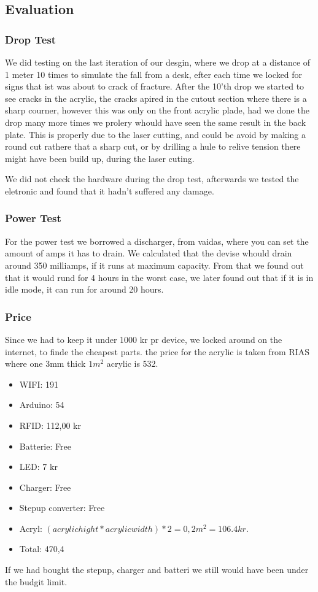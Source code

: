 \subsection{Evaluation}
\subsubsection{Drop Test}
We did testing on the last iteration of our desgin, where we drop at a distance of 1 meter 10 times to simulate the fall from a desk, efter each time we locked for signs that ist was about to crack of fracture.
After the 10'th drop we started to see cracks in the acrylic, the cracks apired in the cutout section where there is a sharp courner, however this was only on the front acrylic plade, had we done the drop many more times we prolery whould have seen the same result in the back plate. 
This is properly due to the laser cutting, and could be avoid by making a round cut rathere that a sharp cut, or by drilling a hule to relive tension there might have been build up, during the laser cuting.

We did not check the hardware during the drop test, afterwards we tested the eletronic and found that it hadn't suffered any damage.

\subsubsection{Power Test}
For the power test we borrowed a discharger, from vaidas, where you can set the amount of amps it has to drain.
We calculated that the devise whould drain around 350 milliamps, if it runs at maximum capacity.
From that we found out that it would rund for 4 hours in the worst case, we later found out that if it is in idle mode, it can run for around 20 hours.

\subsubsection{Price}
Since we had to keep it under 1000 kr pr device, we locked around on the internet, to finde the cheapest parts.
the price for the acrylic is taken from RIAS where one 3mm thick $1 m^2$ acrylic is 532.
\begin{itemize} \itemsep0em
	 \item WIFI: 191 
	 \item Arduino: 54
	 \item RFID: 112,00 kr
	 \item Batterie: Free
	 \item LED: 7 kr
	 \item Charger: Free
	 \item Stepup converter: Free
	  \item Acryl: $(acrylic hight * acrylic width)*2 = 0,2 m^2 = 106.4 kr.$
	 \item Total: 470,4
\end{itemize}
If we had bought the stepup, charger and batteri we still would have been under the budgit limit.
